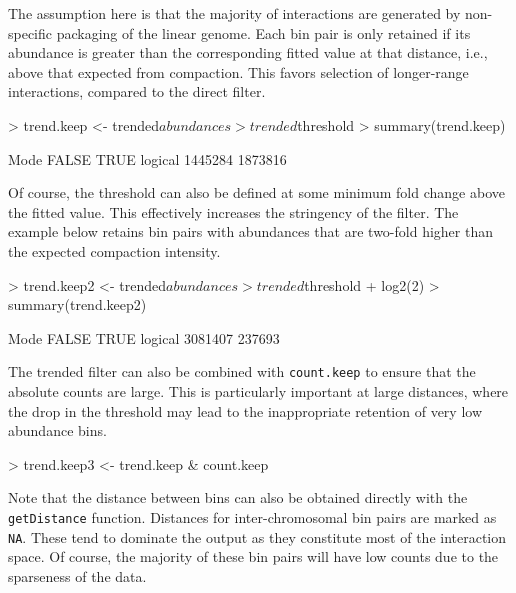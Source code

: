 \documentclass[12pt]{report}
\renewenvironment{Schunk}{\vspace{0pt}}{\vspace{0pt}}
\newcommand{\code}[1]{{\small\texttt{#1}}}
\begin{document}
The assumption here is that the majority of interactions are generated by non-specific packaging of the linear genome.
Each bin pair is only retained if its abundance is greater than the corresponding fitted value at that distance, i.e., above that expected from compaction. 
This favors selection of longer-range interactions, compared to the direct filter.

\begin{Schunk}
\begin{Sinput}
> trend.keep <- trended$abundances > trended$threshold
> summary(trend.keep)
\end{Sinput}
\begin{Soutput}
   Mode   FALSE    TRUE 
logical 1445284 1873816 
\end{Soutput}
\end{Schunk}

Of course, the threshold can also be defined at some minimum fold change above the fitted value.
This effectively increases the stringency of the filter.
The example below retains bin pairs with abundances that are two-fold higher than the expected compaction intensity.

\begin{Schunk}
\begin{Sinput}
> trend.keep2 <- trended$abundances > trended$threshold + log2(2)
> summary(trend.keep2)
\end{Sinput}
\begin{Soutput}
   Mode   FALSE    TRUE 
logical 3081407  237693 
\end{Soutput}
\end{Schunk}

The trended filter can also be combined with \code{count.keep} to ensure that the absolute counts are large.
This is particularly important at large distances, where the drop in the threshold may lead to the inappropriate retention of very low abundance bins.

\begin{Schunk}
\begin{Sinput}
> trend.keep3 <- trend.keep & count.keep
\end{Sinput}
\end{Schunk}

Note that the distance between bins can also be obtained directly with the \code{getDistance} function.
Distances for inter-chromosomal bin pairs are marked as \code{NA}.
These tend to dominate the output as they constitute most of the interaction space.
Of course, the majority of these bin pairs will have low counts due to the sparseness of the data.
\end{document}

